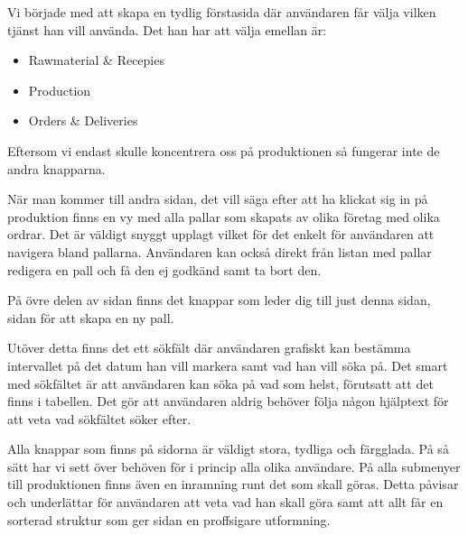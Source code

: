 Vi började med att skapa en tydlig förstasida där användaren får välja vilken tjänst han vill använda. Det han har att välja emellan är:

\begin{itemize}
\item{Rawmaterial \& Recepies}
\item{Production}
\item{Orders \& Deliveries}
\end{itemize}

Eftersom vi endast skulle koncentrera oss på produktionen så fungerar inte de andra knapparna. 

När man kommer till andra sidan, det vill säga efter att ha klickat sig in på produktion finns en vy med alla pallar som skapats av olika företag med olika ordrar. Det är väldigt snyggt upplagt vilket för det enkelt för användaren att navigera bland pallarna. Användaren kan också direkt från listan med pallar redigera en pall och få den ej godkänd samt ta bort den. 

På övre delen av sidan finns det knappar som leder dig till just denna sidan, sidan för att skapa en ny pall. 

Utöver detta finns det ett sökfält där användaren grafiskt kan bestämma intervallet på det datum han vill markera samt vad han vill söka på. Det smart med sökfältet är att användaren kan söka på vad som helst, förutsatt att det finns i tabellen. Det gör att användaren aldrig behöver följa någon hjälptext för att veta vad sökfältet söker efter. 

Alla knappar som finns på sidorna är väldigt stora, tydliga och färgglada. På så sätt har vi sett över behöven för i princip alla olika användare. På alla submenyer till produktionen finns även en inramning runt det som skall göras. Detta påvisar och underlättar för användaren att veta vad han skall göra samt att allt får en sorterad struktur som ger sidan en proffsigare utformning. 